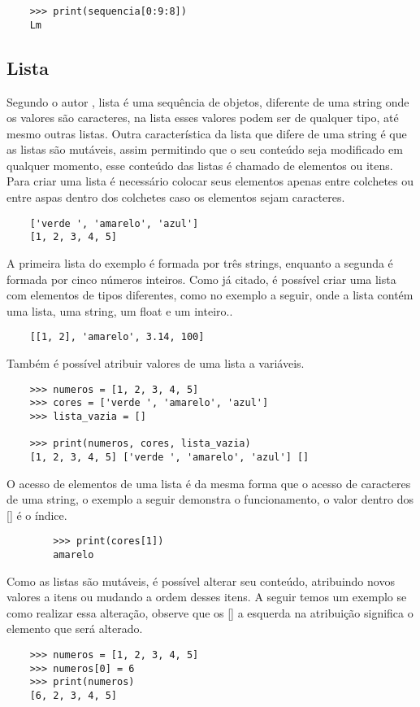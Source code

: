 \begin{itemize}
\begin{lstlisting}
    >>> print(sequencia[0:9:8])
    Lm
        \end{lstlisting}

    \end{itemize}

			\subsection{Lista}
			Segundo o autor \cite{Severance2016}, lista é uma sequência de objetos, diferente de uma string onde os valores são caracteres, na lista esses valores podem ser de qualquer tipo, até mesmo outras listas. Outra característica da lista que difere de uma string é que as listas são mutáveis, assim permitindo que o seu conteúdo seja modificado em qualquer momento, esse conteúdo das listas é chamado de elementos ou itens. Para criar uma lista é necessário colocar seus elementos apenas entre colchetes ou entre aspas dentro dos colchetes caso os elementos sejam caracteres.
			
			\begin{lstlisting}
	['verde ', 'amarelo', 'azul']
	[1, 2, 3, 4, 5]
			\end{lstlisting}
		A primeira lista do exemplo é formada por três strings, enquanto a segunda é formada por cinco números inteiros. Como já citado, é possível criar uma lista com elementos de tipos diferentes, como no exemplo a seguir, onde a lista contém uma lista, uma string, um float e um inteiro..
			
			\begin{lstlisting}
	[[1, 2], 'amarelo', 3.14, 100]
			\end{lstlisting}
		
		Também é possível atribuir valores de uma lista a variáveis.
		\begin{lstlisting}
	>>> numeros = [1, 2, 3, 4, 5]
	>>> cores = ['verde ', 'amarelo', 'azul']
	>>> lista_vazia = []
	
	>>> print(numeros, cores, lista_vazia)
	[1, 2, 3, 4, 5] ['verde ', 'amarelo', 'azul'] []
		\end{lstlisting}
	
	O acesso de elementos de uma lista é da mesma forma que o acesso de caracteres de uma string, o exemplo a seguir demonstra o funcionamento, o valor dentro dos [] é o índice.
	\begin{lstlisting}
		>>> print(cores[1])
		amarelo
	\end{lstlisting}
	Como as listas são mutáveis, é possível alterar seu conteúdo, atribuindo novos valores a itens ou mudando a ordem desses itens. A seguir temos um exemplo se como realizar essa alteração, observe que os [] a esquerda na atribuição significa o elemento que será alterado.
	\begin{lstlisting}
	>>> numeros = [1, 2, 3, 4, 5] 
	>>> numeros[0] = 6
	>>> print(numeros)
	[6, 2, 3, 4, 5]
	\end{lstlisting}

